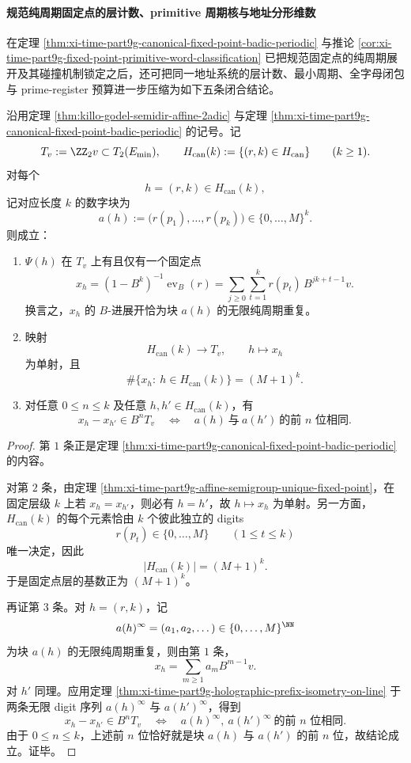 \paragraph{规范纯周期固定点的层计数、primitive 周期核与地址分形维数}
在定理 \ref{thm:xi-time-part9g-canonical-fixed-point-badic-periodic} 与推论 \ref{cor:xi-time-part9g-fixed-point-primitive-word-classification} 已把规范固定点的纯周期展开及其碰撞机制锁定之后，还可把同一地址系统的层计数、最小周期、全字母闭包与 prime-register 预算进一步压缩为如下五条闭合结论。

\begin{theorem}[规范纯周期固定点层的精确基数与前缀球分层]\label{thm:xi-time-part9gb-canonical-fixedpoint-count-prefix-stratification}
沿用定理 \ref{thm:killo-godel-semidir-affine-2adic} 与定理
\ref{thm:xi-time-part9g-canonical-fixed-point-badic-periodic} 的记号。记
\[
T_v:=\ZZ_2v\subset T_2(E_{\min}),
\qquad
H_{\mathrm{can}}(k):=\{(r,k)\in H_{\mathrm{can}}\}
\qquad (k\ge 1).
\]
对每个
\[
h=(r,k)\in H_{\mathrm{can}}(k),
\]
记对应长度 \(k\) 的数字块为
\[
a(h):=\bigl(r(p_1),\dots,r(p_k)\bigr)\in\{0,\dots,M\}^k.
\]
则成立：
\begin{enumerate}
  \item \(\Psi(h)\) 在 \(T_v\) 上有且仅有一个固定点
  \[
  x_h=(1-B^k)^{-1}\operatorname{ev}_B(r)
  =
  \sum_{j\ge 0}\sum_{t=1}^{k}r(p_t)\,B^{jk+t-1}v.
  \]
  换言之，\(x_h\) 的 \(B\)-进展开恰为块 \(a(h)\) 的无限纯周期重复。
  \item 映射
  \[
  H_{\mathrm{can}}(k)\longrightarrow T_v,
  \qquad
  h\longmapsto x_h
  \]
  为单射，且
  \[
  \#\{x_h:\ h\in H_{\mathrm{can}}(k)\}=(M+1)^k.
  \]
  \item 对任意 \(0\le n\le k\) 及任意 \(h,h'\in H_{\mathrm{can}}(k)\)，有
  \[
  x_h-x_{h'}\in B^nT_v
  \quad\Longleftrightarrow\quad
  a(h)\ \text{与}\ a(h')\ \text{的前 }n\text{ 位相同}.
  \]
\end{enumerate}
\end{theorem}
\begin{proof}
第 \(1\) 条正是定理 \ref{thm:xi-time-part9g-canonical-fixed-point-badic-periodic} 的内容。

对第 \(2\) 条，由定理 \ref{thm:xi-time-part9g-affine-semigroup-unique-fixed-point}，在固定层级 \(k\) 上若 \(x_h=x_{h'}\)，则必有 \(h=h'\)，故 \(h\mapsto x_h\) 为单射。另一方面，\(H_{\mathrm{can}}(k)\) 的每个元素恰由 \(k\) 个彼此独立的 digits
\[
r(p_t)\in\{0,\dots,M\}
\qquad (1\le t\le k)
\]
唯一决定，因此
\[
|H_{\mathrm{can}}(k)|=(M+1)^k.
\]
于是固定点层的基数正为 \((M+1)^k\)。

再证第 \(3\) 条。对 \(h=(r,k)\)，记
\[
a(h)^\infty=(a_1,a_2,\dots)\in\{0,\dots,M\}^{\NN}
\]
为块 \(a(h)\) 的无限纯周期重复，则由第 \(1\) 条，
\[
x_h=\sum_{m\ge 1}a_mB^{m-1}v.
\]
对 \(h'\) 同理。应用定理 \ref{thm:xi-time-part9g-holographic-prefix-isometry-on-line} 于两条无限 digit 序列 \(a(h)^\infty\) 与 \(a(h')^\infty\)，得到
\[
x_h-x_{h'}\in B^nT_v
\quad\Longleftrightarrow\quad
a(h)^\infty,\ a(h')^\infty\ \text{的前 }n\text{ 位相同}.
\]
由于 \(0\le n\le k\)，上述前 \(n\) 位恰好就是块 \(a(h)\) 与 \(a(h')\) 的前 \(n\) 位，故结论成立。证毕。
\end{proof}

